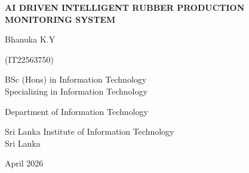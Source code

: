 \thispagestyle{empty}
\begin{center}

\vspace*{2cm}

{\fontsize{16}{24}\selectfont\bfseries
AI DRIVEN INTELLIGENT RUBBER PRODUCTION\\
MONITORING SYSTEM}

\vspace{4cm}

{\fontsize{14}{18}\selectfont
Bhanuka K.Y}

\vspace{0.5cm}

{\fontsize{14}{18}\selectfont
(IT22563750)}

\vspace{2cm}

{\fontsize{14}{18}\selectfont
BSc (Hons) in Information Technology\\
Specializing in Information Technology}

\vspace{2cm}

{\fontsize{14}{18}\selectfont
Department of Information Technology}

\vspace{0.5cm}

{\fontsize{14}{18}\selectfont
Sri Lanka Institute of Information Technology\\
Sri Lanka}

\vspace{1.5cm}

{\fontsize{14}{18}\selectfont
April 2026}

\end{center}
\newpage
